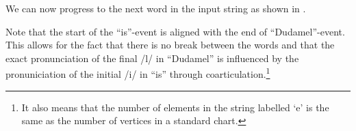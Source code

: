 We can now progress to the next word in the input string as shown in
\nexteg{}.
\begin{ex} 
\end{ex} 
Note that the start of the ``is''-event is aligned with the end of
``Dudamel''-event.  This allows for the fact that there is no break
between the words and that the exact pronunciation of the final /l/ in
``Dudamel'' is influenced by the pronuniciation of the initial /i/ in
``is'' through coarticulation.\footnote{It also means that the number
  of elements in the string labelled `e' is the same as the number of
  vertices in a standard chart.}

